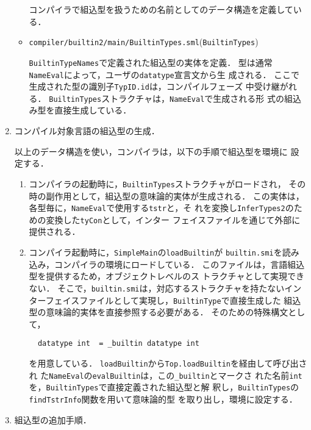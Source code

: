 \documentclass{jbook}
\newcommand{\code}[1]{\mbox{\large\tt #1}}
\newcommand{\module}[2]{\code{#1}(\code{#2})}
\begin{document}
\begin{enumerate}
\begin{itemize}
	コンパイラで組込型を扱うための名前としてのデータ構造を定義してい
る．

\item \module{compiler/builtin2/main/BuiltinTypes.sml}{BuiltinTypes}

	\code{BuiltinTypeNames}で定義された組込型の実体を定義．
	型は通常\code{NameEval}によって，ユーザの\code{datatype}宣言文から生
成される．
	ここで生成された型の識別子\code{TypID.id}は，コンパイルフェーズ
中受け継がれる．
	\code{BuiltinTypes}ストラクチャは，\code{NameEval}で生成される形
式の組込み型を直接生成している．
\end{itemize}

\item コンパイル対象言語の組込型の生成．

	以上のデータ構造を使い，コンパイラは，以下の手順で組込型を環境に
設定する．
\begin{enumerate}
\item コンパイラの起動時に，\code{BuiltinTypes}ストラクチャがロードされ，
その時の副作用として，組込型の意味論的実体が生成される．
	この実体は，各型毎に，\code{NameEval}で使用する\code{tstr}と，そ
れを変換し\code{InferTypes2}のための変換した\code{tyCon}として，インター
フェイスファイルを通じて外部に提供される．

\item コンパイラ起動時に，\code{SimpleMain}の\code{loadBuiltin}が
\code{builtin.smi}を読み込み，コンパイラの環境にロードしている．
	このファイルは，言語組込型を提供するため，オブジェクトレベルのス
トラクチャとして実現できない．
	そこで，\code{builtin.smi}は，対応するストラクチャを持たないイン
ターフェイスファイルとして実現し，\code{BuiltinType}で直接生成した
組込型の意味論的実体を直接参照する必要がある．
	そのための特殊構文として，
\begin{verbatim}
  datatype int  = _builtin datatype int
\end{verbatim}
を用意している．
	\code{loadBuiltin}から\code{Top.loadBuiltin}を経由して呼び出され
た\code{NameEval}の\code{evalBuiltin}は，この\code{\_builtin}とマークさ
れた名前\code{int}を，\code{BuiltinTypes}で直接定義された組込型と解
釈し，\code{BuiltinTypes}の\code{findTstrInfo}関数を用いて意味論的型
を取り出し，環境に設定する．
\end{enumerate}
\item 組込型の追加手順．


\end{enumerate}
\end{document}
